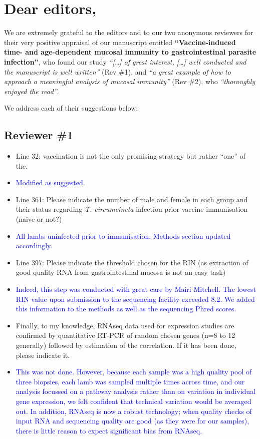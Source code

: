 \documentclass[a4paper, hidelinks, 11pt]{article}
\begin{document}
\section*{Dear editors,}

We are extremely grateful to the editors and to our two anonymous reviewers for their very positive appraisal of our manuscript entitled \textbf{``Vaccine-induced time- and age-dependent mucosal immunity to gastrointestinal parasite infection''}, who found our study \emph{``[\ldots] of great interest, [\ldots] well conducted and the manuscript is well written''} (Rev \#1), and \emph{``a great example of how to approach a meaningful analysis of mucosal immunity''} (Rev \#2), who \emph{``thoroughly enjoyed the read''}.

\noindent We address each of their suggestions below:


\subsection*{Reviewer \#1}

\begin{itemize}
        \item Line 32: vaccination is not the only promising strategy but rather ``one'' of the.
        \item[\rightarrow] \textcolor{blue}{Modified as suggested.}
        \item Line 361: Please indicate the number of male and female in each group and their status regarding \emph{T. circumcincta} infection prior vaccine immunisation (naive or not?)
        \item[\rightarrow] \textcolor{blue}{All lambs uninfected prior to immunisation. Methods section updated accordingly.}
        \item Line 397: Please indicate the threshold chosen for the RIN (as extraction of good quality RNA from gastrointestinal mucosa is not an easy task)
        \item[\rightarrow] \textcolor{blue}{Indeed, this step was conducted with great care by Mairi Mitchell. The lowest RIN value upon submission to the sequencing facility exceeded 8.2. We added this information to the methods as well as the sequencing Phred scores.}
        \item Finally, to my knowledge, RNAseq data used for expression studies are confirmed by quantitative RT-PCR of random chosen genes (n=8 to 12 generally) followed by estimation of the correlation. If it has been done, please indicate it.
        \item[\rightarrow] \textcolor{blue}{This was not done. However, because each sample was a high quality pool of three biopsies, each lamb was sampled multiple times across time, and our analysis focussed on a pathway analysis rather than on variation in individual gene expression, we felt confident that technical variation would be averaged out. In addition, RNAseq is now a robust technology; when quality checks of input RNA and sequencing quality are good (as they were for our samples), there is little reason to expect significant bias from RNAseq.}
\end{itemize}
\end{document}
